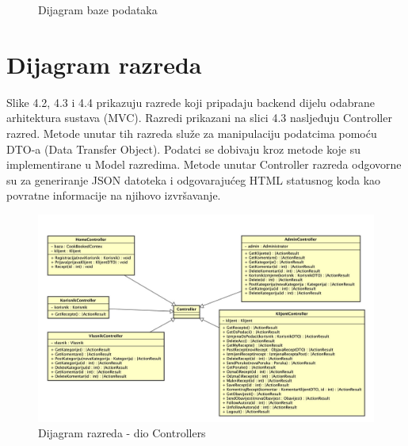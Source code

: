 			\begin{figure}[H]
				\centering
				\caption{Dijagram baze podataka}
				\label{fig:bpdiag}
			\end{figure}
			
			
		\section{Dijagram razreda}

		Slike 4.2, 4.3 i 4.4 prikazuju razrede koji pripadaju backend dijelu odabrane
		arhitektura sustava (MVC). Razredi prikazani na slici 4.3 nasljeđuju Controller
		razred. Metode unutar tih razreda služe za manipulaciju podatcima pomoću
		DTO-a (Data Transfer Object). Podatci se dobivaju kroz metode koje su implementirane
		u Model razredima. Metode unutar Controller razreda odgovorne su za generiranje JSON datoteka
		i odgovarajućeg HTML statusnog koda kao povratne informacije na njihovo izvršavanje.

		\eject
		
		\begin{figure}[H]
			\includegraphics[scale=0.32]{dijagrami/razdijag_controller.jpeg} 
			\centering
			\caption{Dijagram razreda - dio Controllers}
			\label{fig:bpdiag}
		\end{figure}

